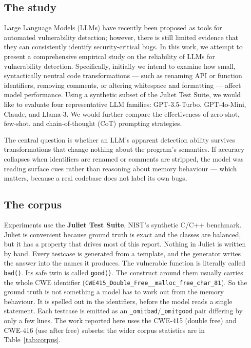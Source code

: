\documentclass[11pt]{article}
\begin{document}
\subsection*{The study}

Large Language Models (LLMs) have recently been proposed as tools for automated
vulnerability detection; however, there is still limited evidence that they can consistently
identify security-critical bugs. In this work, we attempt to present a comprehensive empirical study on the
reliability of LLMs for vulnerability detection. Specifically, initially we intend to examine how small,
syntactically neutral code transformations --- such as renaming API or function identifiers,
removing comments, or altering whitespace and formatting --- affect model performance. Using a
synthetic subset of the Juliet Test Suite, we would like to evaluate four representative LLM
families: GPT-3.5-Turbo, GPT-4o-Mini, Claude, and Llama-3. We would further compare the
effectiveness of zero-shot, few-shot, and chain-of-thought (CoT) prompting strategies.

The central question is whether an LLM's apparent detection ability survives transformations
that change nothing about the program's semantics. If accuracy collapses when identifiers are
renamed or comments are stripped, the model was reading surface cues rather than reasoning about
memory behaviour --- which matters, because a real codebase does not label its own bugs.

\subsection*{The corpus}

Experiments use the \textbf{Juliet Test Suite}, NIST's synthetic C/C++ benchmark. Juliet is
convenient because ground truth is exact and the classes are balanced, but it has a property
that drives most of this report. Nothing in Juliet is written by hand. Every testcase is
generated from a template, and the generator writes the answer into the names it produces. The
vulnerable function is literally called \texttt{bad()}. Its safe twin is called \texttt{good()}.
The construct around them usually carries the whole CWE identifier
(\texttt{CWE415\_Double\_Free\_\_malloc\_free\_char\_81}). So the ground truth is not something a
model has to work out from the memory behaviour. It is spelled out in the identifiers, before the
model reads a single statement. Each testcase is emitted as an
\texttt{\_omitbad}/\texttt{\_omitgood} pair differing by only a few lines. The work reported here
uses the CWE-415 (double free) and CWE-416 (use after free) subsets; the wider corpus statistics
are in Table~\ref{tab:corpus}.
\end{document}
